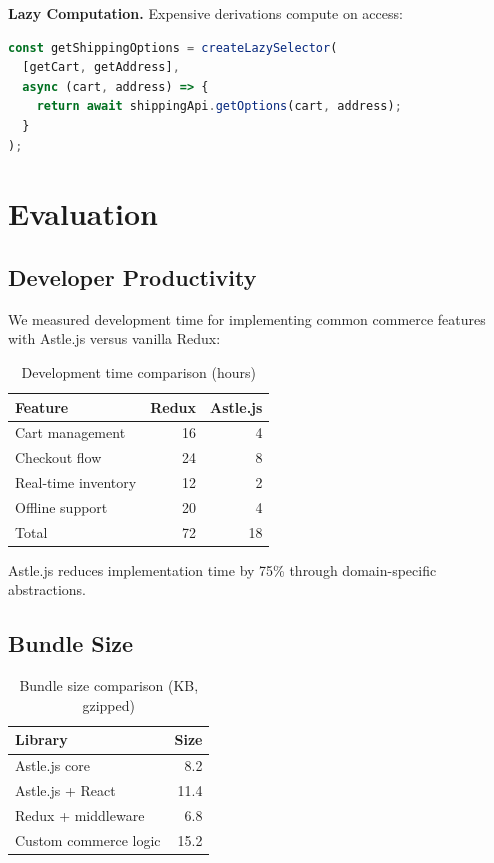 \documentclass[11pt,twocolumn]{article}
\begin{document}
\textbf{Lazy Computation.} Expensive derivations compute on access:

\begin{lstlisting}[language=JavaScript,caption=Lazy selectors]
const getShippingOptions = createLazySelector(
  [getCart, getAddress],
  async (cart, address) => {
    return await shippingApi.getOptions(cart, address);
  }
);
\end{lstlisting}

\section{Evaluation}

\subsection{Developer Productivity}

We measured development time for implementing common commerce features with Astle.js versus vanilla Redux:

\begin{table}[h]
\centering
\caption{Development time comparison (hours)}
\label{tab:devtime}
\begin{tabular}{lrr}
\hline
Feature & Redux & Astle.js \\
\hline
Cart management & 16 & 4 \\
Checkout flow & 24 & 8 \\
Real-time inventory & 12 & 2 \\
Offline support & 20 & 4 \\
\hline
Total & 72 & 18 \\
\hline
\end{tabular}
\end{table}

Astle.js reduces implementation time by 75\% through domain-specific abstractions.

\subsection{Bundle Size}

\begin{table}[h]
\centering
\caption{Bundle size comparison (KB, gzipped)}
\label{tab:bundle}
\begin{tabular}{lr}
\hline
Library & Size \\
\hline
Astle.js core & 8.2 \\
Astle.js + React & 11.4 \\
Redux + middleware & 6.8 \\
Custom commerce logic & 15.2 \\
\hline
\end{tabular}
\end{table}
\end{document}
